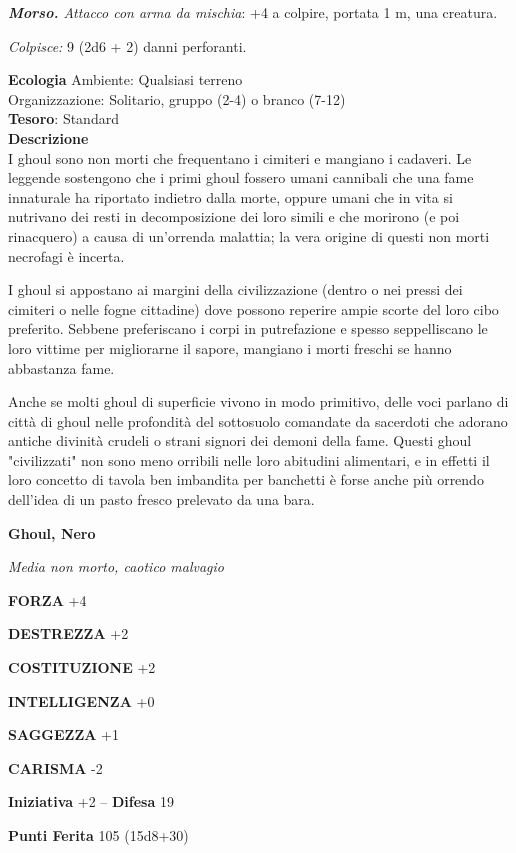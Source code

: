 \begin{multicols}{2}
	\textit{\textbf{Morso.} Attacco con arma da mischia}: +4 a colpire, portata 1 m, una creatura.

	\textit{Colpisce:} 9 (2d6 + 2) danni perforanti.

	\textbf{Ecologia}
	Ambiente: Qualsiasi terreno\\
	Organizzazione: Solitario, gruppo (2-4) o branco (7-12)\\
	\textbf{Tesoro}: Standard\\
	\textbf{Descrizione}\\
	I ghoul sono non morti che frequentano i cimiteri e mangiano i cadaveri. Le leggende sostengono che i primi ghoul fossero umani cannibali che una fame innaturale ha riportato indietro dalla morte, oppure umani che in vita si nutrivano dei resti in decomposizione dei loro simili e che morirono (e poi rinacquero) a causa di un'orrenda malattia; la vera origine di questi non morti necrofagi è incerta.

	I ghoul si appostano ai margini della civilizzazione (dentro o nei pressi dei cimiteri o nelle fogne cittadine) dove possono reperire ampie scorte del loro cibo preferito. Sebbene preferiscano i corpi in putrefazione e spesso seppelliscano le loro vittime per migliorarne il sapore, mangiano i morti freschi se hanno abbastanza fame.


	Anche se molti ghoul di superficie vivono in modo primitivo, delle voci parlano di città di ghoul nelle profondità del sottosuolo comandate da sacerdoti che adorano antiche divinità crudeli o strani signori dei demoni della fame. Questi ghoul "civilizzati" non sono meno orribili nelle loro abitudini alimentari, e in effetti il loro concetto di tavola ben imbandita per banchetti è forse anche più orrendo dell'idea di un pasto fresco prelevato da una bara.

	\medskip{}\textbf{Ghoul, Nero}

	\textit{Media non morto, caotico malvagio}

	\textbf{FORZA} +4

	\textbf{DESTREZZA} +2

	\textbf{COSTITUZIONE} +2

	\textbf{INTELLIGENZA} +0

	\textbf{SAGGEZZA} +1

	\textbf{CARISMA} -2

	\textbf{Iniziativa} +2 -- \textbf{Difesa} 19

	\textbf{Punti Ferita} 105 (15d8+30)


\end{multicols}
